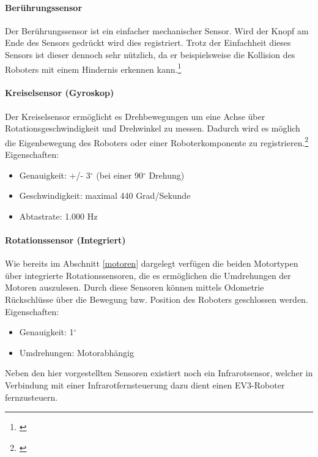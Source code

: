 \paragraph{Berührungssensor}
Der Berührungssensor ist ein einfacher mechanischer Sensor. Wird der Knopf am Ende des Sensors gedrückt wird dies registriert. Trotz der Einfachheit dieses Sensors ist dieser dennoch sehr nützlich, da er beispielsweise die Kollision des Roboters mit einem Hindernis erkennen kann.\footnote{\citep[vgl.][Das EV3 Roboter Universum, Seite 33]{Scholz.DasEV3}\label{note31}}
\paragraph{Kreiselsensor (Gyroskop)}
Der Kreiselsensor ermöglicht es Drehbewegungen um eine Achse über Rotationsgeschwindigkeit und Drehwinkel zu messen. Dadurch wird es möglich die Eigenbewegung des Roboters oder einer Roboterkomponente zu registrieren.\footnote{\citep[vgl.][Das EV3 Roboter Universum, Seite 33]{Scholz.DasEV3}\label{note32}}
\medskip
\newline
Eigenschaften:
\begin{itemize}
	\item{Genauigkeit: +/- 3$^\circ$ (bei einer 90$^\circ$ Drehung)}
	\item{Geschwindigkeit: maximal 440 Grad/Sekunde}
	\item{Abtastrate: 1.000 Hz}
\end{itemize}
\paragraph{Rotationssensor (Integriert)}
Wie bereits im Abschnitt \eqref{motoren} dargelegt verfügen die beiden Motortypen über integrierte Rotationssensoren, die es ermöglichen die Umdrehungen der Motoren auszulesen. Durch diese Sensoren können mittels Odometrie Rückschlüsse über die Bewegung bzw. Position des Roboters geschlossen werden.
\medskip
\newline
Eigenschaften:
\begin{itemize}
	\item{Genauigkeit: 1$^\circ$ }
	\item{Umdrehungen: Motorabhängig}
\end{itemize}
\bigskip
Neben den hier vorgestellten Sensoren existiert noch ein Infrarotsensor, welcher in Verbindung mit einer Infrarotfernsteuerung dazu dient einen EV3-Roboter fernzusteuern.
